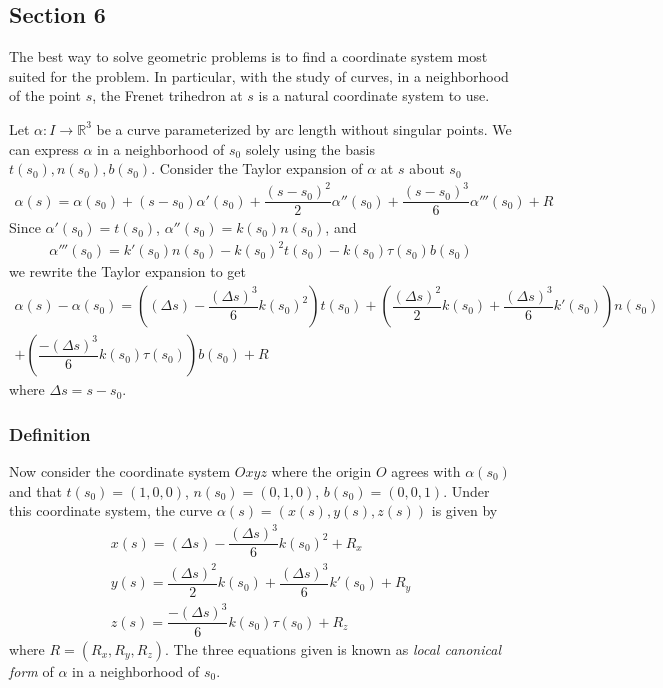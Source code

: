 \documentclass{article}
\newcommand{\R}{\mathbb{R}}
\begin{document}
	\subsection*{Section 6}
	The best way to solve geometric problems is to find a coordinate system most suited for the problem. In particular, with the study of curves, in a neighborhood of the point $s$, the Frenet trihedron at $s$ is a natural coordinate system to use.
	
	Let $\alpha: I \to \R^3$ be a curve parameterized by arc length without singular points. We can express $\alpha$ in a neighborhood of $s_0$ solely using the basis $t(s_0), n(s_0), b(s_0)$. Consider the Taylor expansion of $\alpha$ at $s$ about $s_0$
	\begin{gather*}
		\alpha(s) = \alpha(s_0) + (s - s_0) \alpha'(s_0) + \dfrac{(s - s_0)^2}{2} \alpha''(s_0) + \dfrac{(s - s_0)^3}{6} \alpha'''(s_0) + R
	\end{gather*}
	Since $\alpha'(s_0) = t(s_0)$, $\alpha''(s_0) = k(s_0) n(s_0)$, and
	\begin{gather*}
		\alpha'''(s_0) = k'(s_0) n(s_0) - k(s_0)^2 t(s_0) - k(s_0) \tau(s_0) b(s_0)
	\end{gather*}
	we rewrite the Taylor expansion to get
	\begin{gather*}
		\alpha(s) - \alpha(s_0) = \left( (\Delta s) - \dfrac{(\Delta s)^3}{6} k(s_0)^2 \right) t(s_0)
		+ \left( \dfrac{(\Delta s)^2}{2} k(s_0) + \dfrac{(\Delta s)^3}{6} k'(s_0) \right) n(s_0) \\
		+ \left( \dfrac{-(\Delta s)^3}{6} k(s_0) \tau(s_0) \right) b(s_0) + R
	\end{gather*}
	where $\Delta s = s - s_0$.
	
	\subsubsection*{Definition}
	Now consider the coordinate system $Oxyz$ where the origin $O$ agrees with $\alpha(s_0)$ and that $t(s_0) = (1, 0, 0)$, $n(s_0) = (0, 1, 0)$, $b(s_0) = (0, 0, 1)$. Under this coordinate system, the curve $\alpha(s) = (x(s), y(s), z(s))$ is given by
	\begin{gather*}
		x(s) = (\Delta s) - \dfrac{(\Delta s)^3}{6} k(s_0)^2 + R_x \\
		y(s) = \dfrac{(\Delta s)^2}{2} k(s_0) + \dfrac{(\Delta s)^3}{6} k'(s_0) + R_y \\
		z(s) = \dfrac{-(\Delta s)^3}{6} k(s_0) \tau(s_0) + R_z
	\end{gather*} 
	where $R = (R_x, R_y, R_z)$. The three equations given is known as \textit{local canonical form} of $\alpha$ in a neighborhood of $s_0$.
	
\end{document}

